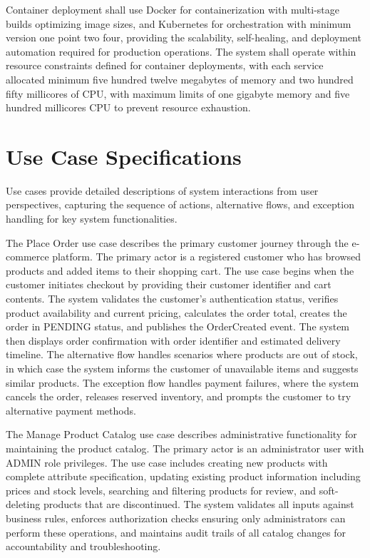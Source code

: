 Container deployment shall use Docker for containerization with multi-stage builds optimizing image sizes, and Kubernetes for orchestration with minimum version one point two four, providing the scalability, self-healing, and deployment automation required for production operations. The system shall operate within resource constraints defined for container deployments, with each service allocated minimum five hundred twelve megabytes of memory and two hundred fifty millicores of CPU, with maximum limits of one gigabyte memory and five hundred millicores CPU to prevent resource exhaustion.

\section{Use Case Specifications}

Use cases provide detailed descriptions of system interactions from user perspectives, capturing the sequence of actions, alternative flows, and exception handling for key system functionalities.

The Place Order use case describes the primary customer journey through the e-commerce platform. The primary actor is a registered customer who has browsed products and added items to their shopping cart. The use case begins when the customer initiates checkout by providing their customer identifier and cart contents. The system validates the customer's authentication status, verifies product availability and current pricing, calculates the order total, creates the order in PENDING status, and publishes the OrderCreated event. The system then displays order confirmation with order identifier and estimated delivery timeline. The alternative flow handles scenarios where products are out of stock, in which case the system informs the customer of unavailable items and suggests similar products. The exception flow handles payment failures, where the system cancels the order, releases reserved inventory, and prompts the customer to try alternative payment methods.

The Manage Product Catalog use case describes administrative functionality for maintaining the product catalog. The primary actor is an administrator user with ADMIN role privileges. The use case includes creating new products with complete attribute specification, updating existing product information including prices and stock levels, searching and filtering products for review, and soft-deleting products that are discontinued. The system validates all inputs against business rules, enforces authorization checks ensuring only administrators can perform these operations, and maintains audit trails of all catalog changes for accountability and troubleshooting.

